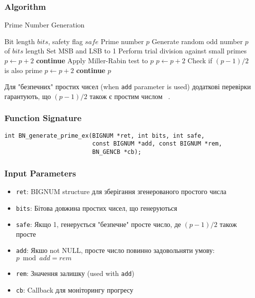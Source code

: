 \subsubsection{Algorithm}
\begin{algorithm}
    \caption{Prime Number Generation}
    \begin{algorithmic}[1]
        \Require Bit length $bits$, safety flag $safe$
        \Ensure Prime number $p$
        \State Generate random odd number $p$ of $bits$ length
        \State Set MSB and LSB to 1
        \Repeat
        \State Perform trial division against small primes
        \State $p \gets p + 2$
        \State \textbf{continue}
        \EndIf
        \State Apply Miller-Rabin test to $p$
        \State $p \gets p + 2$
        \Else
        \State Check if $(p-1)/2$ is also prime
        \State $p \gets p + 2$
        \State \textbf{continue}
        \EndIf
        \EndIf
        \State \Return $p$
        \EndIf
    \end{algorithmic}
\end{algorithm}

Для "безпечних"{} простих чисел (when \texttt{add} parameter is used) додаткові перевірки гарантують, що $(p-1)/2$ 
також є простим числом ~\cite{schneier2015applied}.

\subsubsection{Function Signature}
\begin{verbatim}
int BN_generate_prime_ex(BIGNUM *ret, int bits, int safe,
                         const BIGNUM *add, const BIGNUM *rem,
                         BN_GENCB *cb);
\end{verbatim}

\subsubsection{Input Parameters}
\begin{itemize}
    \item \texttt{ret}: BIGNUM structure для зберігання згенерованого простого числа
    \item \texttt{bits}: Бітова довжина простих чисел, що генеруються
    \item \texttt{safe}: Якщо 1, генерується "безпечне"{} просте число, де $(p-1)/2$ також просте
    \item \texttt{add}: Якшо not NULL, просте число повинно задовольняти умову: $p \bmod add = rem$
    \item \texttt{rem}: Значення залишку (used with \texttt{add})
    \item \texttt{cb}: Callback для моніторингу прогресу
\end{itemize}

